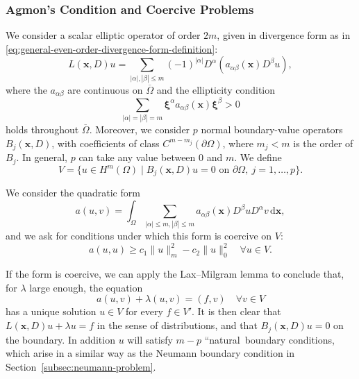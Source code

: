 \subsubsection{Agmon's Condition and Coercive Problems}\label{subsec:agmon-condition-coercive-problems}

We consider a scalar elliptic operator of order $2m$, given in divergence form as in \eqref{eq:general-even-order-divergence-form-definition}:
\begin{equation}\label{eq:agmon-coercive-divergence-operator}
L(\bm{x},D)u=\sum_{|\alpha|,|\beta|\leq m}(-1)^{|\alpha|}D^\alpha(a_{\alpha\beta}(\bm{x})D^\beta u),
\end{equation}
where the $a_{\alpha\beta}$ are continuous on $\overline\Omega$ and the ellipticity condition
\begin{equation}\label{eq:agmon-principal-ellipticity-condition}
\sum_{|\alpha|=|\beta|=m}\bm{\xi}^\alpha a_{\alpha\beta}(\bm{x})\bm{\xi}^\beta>0
\end{equation}
holds throughout $\overline\Omega$. Moreover, we consider $p$ normal boundary-value operators $B_j(\bm{x},D)$, with coefficients of class $C^{m-m_j}(\partial\Omega)$, where $m_j<m$ is the order of $B_j$. In general, $p$ can take any value between $0$ and $m$. We define
\begin{equation}\label{eq:agmon-essential-boundary-admissible-space}
V=\{u\in H^m(\Omega)\mid B_j(\bm{x},D)u=0\text{ on }\partial\Omega,\ j=1,\ldots,p\}.
\end{equation}


We consider the quadratic form
\begin{equation}\label{eq:agmon-boundary-constrained-quadratic-form}
a(u,v)=\int_\Omega\sum_{|\alpha|\leq m,|\beta|\leq m}a_{\alpha\beta}(\bm{x})D^\beta uD^\alpha v\,\mathrm{d}\bm{x},
\end{equation}
and we ask for conditions under which this form is coercive on $V$:
\begin{equation}\label{eq:agmon-boundary-constrained-coercive-estimate}
a(u,u)\geq c_1\|u\|_m^2-c_2\|u\|_0^2\quad\forall u\in V.
\end{equation}


If the form is coercive, we can apply the Lax--Milgram lemma to conclude that, for $\lambda$ large enough, the equation
\begin{equation}\label{eq:agmon-shifted-constrained-variational-equation}
a(u,v)+\lambda(u,v)=(f,v)\quad\forall v\in V
\end{equation}
has a unique solution $u\in V$ for every $f\in V\prime$. It is then clear that $L(\bm{x},D)u+\lambda u=f$ in the sense of distributions, and that $B_j(\bm{x},D)u=0$ on the boundary. In addition $u$ will satisfy $m-p$ ``natural\textquotesingle\textquotesingle\ boundary conditions, which arise in a similar way as the Neumann boundary condition in Section~\ref{subsec:neumann-problem}.

